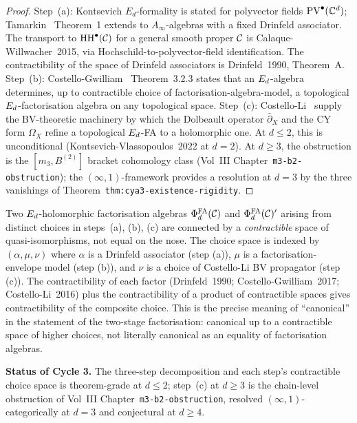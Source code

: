 \begin{proof}
Step~\textup{(a)}: Kontsevich $E_d$-formality is stated for polyvector
fields $\mathrm{PV}^\bullet(\mathbb{C}^d)$; Tamarkin~\cite{Tamarkin2007}
Theorem~1 extends to $A_\infty$-algebras with a fixed
Drinfeld associator. The transport to $\mathrm{HH}^\bullet(\mathcal{C})$ for a
general smooth proper $\mathcal{C}$ is Calaque-Willwacher~2015, via
Hochschild-to-polyvector-field identification. The contractibility of
the space of Drinfeld associators is Drinfeld~1990, Theorem~A.
Step~\textup{(b)}: Costello-Gwilliam~\cite{CostelloGwilliam2017}
Theorem~3.2.3 states that an $E_d$-algebra determines, up to
contractible choice of factorisation-algebra-model, a topological
$E_d$-factorisation algebra on any topological space. Step~\textup{(c)}:
Costello-Li~\cite{CostelloLi2016,CostelloLi2020} supply the BV-theoretic
machinery by which the Dolbeault operator $\bar\partial_X$ and the CY
form $\Omega_X$ refine a topological $E_d$-FA to a holomorphic one. At
$d \le 2$, this is unconditional (Kontsevich-Vlassopoulos~2022 at
$d = 2$). At $d \ge 3$, the obstruction is the $[m_3, B^{(2)}]$
bracket cohomology class (Vol~III Chapter~\texttt{m3-b2-obstruction});
the $(\infty,1)$-framework provides a resolution at $d = 3$ by the
three vanishings of Theorem~\texttt{thm:cya3-existence-rigidity}.
\end{proof}

\begin{remark}
\label{wn:rem:agent5-canonical-up-to-contractible}
Two $E_d$-holomorphic factorisation algebras $\Phi^{\mathrm{FA}}_d(\mathcal{C})$ and
$\Phi^{\mathrm{FA}}_d(\mathcal{C})'$ arising from distinct choices in steps~(a), (b), (c)
are connected by a \emph{contractible} space of quasi-isomorphisms,
not equal on the nose. The choice space is indexed by $(\alpha, \mu, \nu)$
where $\alpha$ is a Drinfeld associator (step (a)), $\mu$ is a
factorisation-envelope model (step (b)), and $\nu$ is a choice of
Costello-Li BV propagator (step (c)). The contractibility of each
factor (Drinfeld~1990; Costello-Gwilliam~2017; Costello-Li~2016) plus
the contractibility of a product of contractible spaces gives
contractibility of the composite choice. This is the precise meaning
of ``canonical'' in the statement of the two-stage factorisation:
canonical up to a contractible space of higher choices, not literally
canonical as an equality of factorisation algebras.
\end{remark}

\medskip
\noindent\textbf{Status of Cycle 3.} The three-step decomposition and
each step's contractible choice space is theorem-grade at $d \le 2$;
step~(c) at $d \ge 3$ is the chain-level obstruction of Vol~III
Chapter~\texttt{m3-b2-obstruction}, resolved $(\infty,1)$-categorically
at $d = 3$ and conjectural at $d \ge 4$.


